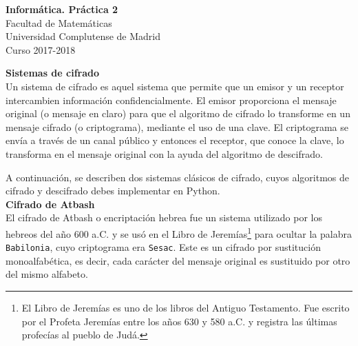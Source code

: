 \documentclass[a4paper,11pt]{article}
\begin{document}
\begin{center}
{\huge \bf Inform\'atica. Pr\'actica 2}\\[0.5ex]
{\Large Facultad de Matem\'aticas}\\
{\Large Universidad Complutense de Madrid}\\
{\large Curso 2017-2018}\\[2ex]
\end{center}
%
{\Large\bf Sistemas de cifrado}\\
Un sistema de cifrado es aquel sistema que permite que un emisor y un receptor intercambien informaci\'on confidencialmente. El emisor proporciona el mensaje original (o mensaje en claro) para que el algoritmo de cifrado lo transforme en un mensaje cifrado (o criptograma), mediante el uso de una clave. El criptograma se env\'ia a trav\'es de un canal p\'ublico y entonces el receptor, que conoce la clave, lo transforma en el mensaje original con la ayuda del algoritmo de descifrado.

A continuaci\'on, se describen dos sistemas cl\'asicos de cifrado, cuyos algoritmos de cifrado y descifrado debes implementar en Python.\\[2ex]
%
{\large \bf Cifrado de Atbash}\\
El cifrado de Atbash o encriptaci\'on hebrea fue un sistema utilizado por los hebreos del a\~no 600 a.C. y se us\'o en el Libro de Jerem\'ias\footnote{El Libro de Jerem\'ias es uno de los libros del Antiguo Testamento. Fue escrito por el Profeta Jerem\'ias entre los a\~nos 630 y 580 a.C. y registra las \'ultimas profec\'ias al pueblo de Jud\'a.} para ocultar la palabra \texttt{Babilonia}, cuyo criptograma era \texttt{Sesac}. Este es un cifrado por sustituci\'on monoalfab\'etica, es decir, cada car\'acter del mensaje original es sustituido por otro del mismo alfabeto. 
\end{document}

